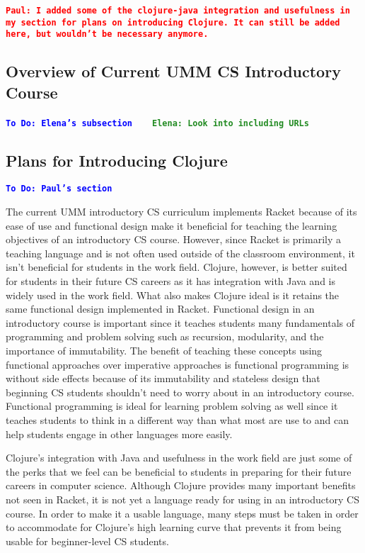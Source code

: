 \documentclass[12pt]{article}
\newcommand{\comment}[1]{{\bf \tt  {#1}}}
\newcommand{\emcomment}[1]{\textcolor{ForestGreen}{\comment{Elena: {#1}}}}
\newcommand{\todo}[1]{\textcolor{blue}{\comment{To Do: {#1}}}}
\newcommand{\pscomment}[1]{\textcolor{red}{\comment{Paul: {#1}}}}
\begin{document}
\pscomment{I added some of the clojure-java integration and usefulness in my section for plans on introducing Clojure.  It can still be added here, but wouldn't be necessary anymore.}

\subsection{Overview of Current UMM CS Introductory Course}\label{subsec:course}
\todo{Elena's subsection}
~\cite{htdp}
~\cite{lein} \emcomment{Look into including URLs}

\subsection{Plans for Introducing Clojure}\label{subsec:plans}
\todo{Paul's section}

The current UMM introductory CS curriculum implements Racket because of its ease of use and functional design make it beneficial for teaching the learning objectives of an introductory CS course.  However, since Racket is primarily a teaching language and is not often used outside of the classroom environment, it isn’t beneficial for students in the work field. Clojure, however, is better suited for students in their future CS careers as it has integration with Java and is widely used in the work field. What also makes Clojure ideal is it retains the same functional design implemented in Racket. Functional design in an introductory course is important since it teaches students many fundamentals of programming and problem solving such as recursion, modularity, and the importance of immutability. The benefit of teaching these concepts using functional approaches over imperative approaches is functional programming is without side effects because of its immutability and stateless design that beginning CS students shouldn’t need to worry about in an introductory course. Functional programming is ideal for learning problem solving as well since it teaches students to think in a different way than what most are use to and can help students engage in other languages more easily.

Clojure’s integration with Java and usefulness in the work field are just some of the perks that we feel can be beneficial to students in preparing for their future careers in computer science.  Although Clojure provides many important benefits not seen in Racket, it is not yet a language ready for using in an introductory CS course. In order to make it a usable language, many steps must be taken in order to accommodate for Clojure’s high learning curve that prevents it from being usable for beginner-level CS students.
\end{document}
